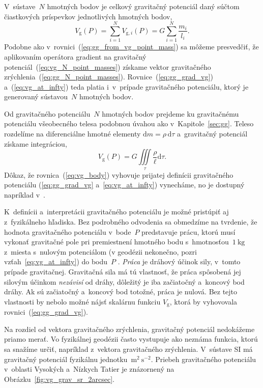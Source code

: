 \documentclass[a4paper, 12pt]{book}
\newcommand{\diff}{\mathrm d}
\newcommand{\gidx}{\mathrm g}
\begin{document}
V~sústave~$N$ hmotných bodov je celkový gravitačný potenciál daný súčtom
čiastkových príspevkov jednotlivých hmotných bodov,
%
\begin{equation}
\label{eq:vg_N_point_masses}
V_\gidx(P) = \sum_{i = 1}^{N} V_{\gidx,i}(P) = G \sum_{i = 1}^{N}\frac{
m_i}{l_i}{.}
\end{equation}
%
Podobne ako v~rovnici~(\ref{eq:gg_from_vg_point_mass}) sa môžeme presvedčiť, že 
aplikovaním operátora gradient na gravitačný
potenciál~(\ref{eq:vg_N_point_masses}) získame vektor gravitačného
zrýchlenia~(\ref{eq:gg_N_point_masses}).  Rovnice~(\ref{eq:gg_grad_vg}) 
a~(\ref{eq:vg_at_infty}) teda platia i~v~prípade gravitačného
potenciálu, ktorý je generovaný sústavou~$N$ hmotných bodov.

Od gravitačného potenciálu~$N$ hmotných bodov prejdeme ku
gravitačnému potenciálu všeobecného telesa podobnou úvahou ako
v~Kapitole~\ref{sec:gg}.  Teleso rozdelíme na diferenciálne hmotné elementy
$\diff m = \rho \, \diff \tau$ a~gravitačný potenciál získame integráciou,
%
\begin{equation}
\label{eq:vg_body}
V_\gidx(P) = G \iiint\limits_{\tau} \frac{\rho}{\ell} \diff\tau{.}
\end{equation}
%
Dôkaz, že rovnica~(\ref{eq:vg_body}) vyhovuje prijatej definícii gravitačného
potenciálu (\ref{eq:gg_grad_vg} a~\ref{eq:vg_at_infty}) vynecháme, no je
dostupný napríklad v~\textcite{MacMillan1930}.

K~definícii a~interpretácii gravitačného potenciálu je možné pristúpiť aj 
z~fyzikálneho hľadiska.  Bez podrobného odvodenia sa obmedzíme na tvrdenie, že 
hodnota gravitačného potenciálu v~bode~$P$ predstavuje prácu, ktorú musí 
vykonať gravitačné pole pri premiestnení hmotného bodu s~hmotnosťou~$1\ 
\mathrm{kg}$ z~miesta s~nulovým potenciálom (v geodézii nekonečno, pozri 
vzťah~\ref{eq:vg_at_infty}) do bodu~$P$ 
\parencite{MacMillan1930,Kellogg1967,TorgeGeodesy}.  \emph{Práca} je dráhový 
účinok sily, v~tomto prípade gravitačnej.  Gravitačná sila má tú vlastnosť, že 
práca spôsobená jej silovým účinkom \emph{nezávisí} od dráhy, dôležitý je iba 
začiatočný a~koncový bod dráhy.  Ak sú začiatočný a~koncový bod totožné, práca 
je nulová.  Bez tejto vlastnosti by nebolo možné nájsť skalárnu funkciu 
$V_\gidx$, ktorá by vyhovovala rovnici~(\ref{eq:gg_grad_vg}).

Na rozdiel od vektora gravitačného zrýchlenia, gravitačný potenciál nedokážeme
priamo merať.  Vo fyzikálnej geodézii často vystupuje ako neznáma funkcia,
ktorú sa snažíme určiť, napríklad z~vektora gravitačného zrýchlenia.  V~sústave
SI má gravitačný potenciál fyzikálnu jednotku~$\mathrm{m}^2\ \mathrm{s}^{-2}$.
Priebeh gravitačného potenciálu v~oblasti Vysokých a~Nízkych Tatier je
znázornený na Obrázku~\ref{fig:vg_grav_sr_2arcsec}.
\end{document}
